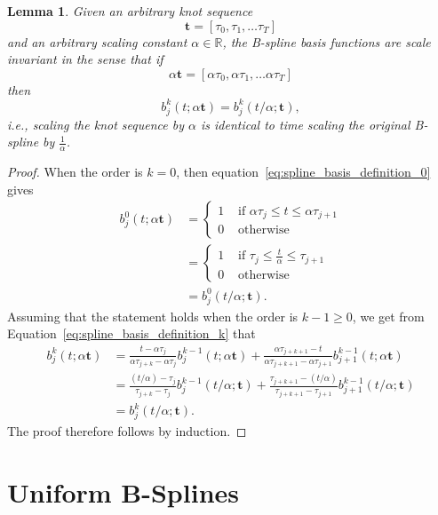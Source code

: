 \documentclass{article}
\newtheorem{lemma}[theorem]{Lemma}
\begin{document}
\begin{lemma}\label{lem:bases_are_scale_invariant}
Given an arbitrary knot sequence
\[
\mathbf{t} = [\tau_0, \tau_1, \dots \tau_T]
\]
and an arbitrary scaling constant $\alpha\in\mathbb{R}$, the B-spline basis functions are scale invariant in the sense that
if 
\[
\alpha\mathbf{t} = [\alpha\tau_0, \alpha\tau_1, \dots \alpha\tau_T]
\]
then
\[
b_j^k(t; \alpha\mathbf{t}) = b_j^k(t/\alpha; \mathbf{t}),
\]
i.e., scaling the knot sequence by $\alpha$ is identical to time scaling the original B-spline by $\frac{1}{\alpha}$.
\end{lemma}
\begin{proof}
When the order is $k=0$, then equation~\eqref{eq:spline_basis_definition_0} gives
\begin{align*}
	b_j^0(t; \alpha\mathbf{t}) &= \begin{cases} 1 & \text{~if~} \alpha\tau_j \leq t \leq \alpha\tau_{j+1} \\ 
 									 				   0 & \text{~otherwise} 
 					   					 \end{cases} \\
 					   				   &= \begin{cases} 1 & \text{~if~} \tau_j \leq \frac{t}{\alpha} \leq \tau_{j+1} \\ 
 									 				   0 & \text{~otherwise} 
 					   					 \end{cases} \\ 	
 					   				   &= b_j^0(t/\alpha; \mathbf{t}).
\end{align*}
Assuming that the statement holds when the order is $k-1\geq 0$, we get from 
Equation~\eqref{eq:spline_basis_definition_k} that
\begin{align*}
b_j^k(t; \alpha\mathbf{t}) &= \frac{t-\alpha\tau_j}{\alpha\tau_{j+k}-
\alpha\tau_j} b_j^{k-1}(t; \alpha\mathbf{t}) + \frac{\alpha\tau_{j+k+1}-t}{\alpha\tau_{j+k+1}-\alpha\tau_{j+1}} b_{j+1}^{k-1}(t; \alpha\mathbf{t}) \\
&= \frac{(t/\alpha)-\tau_j}{\tau_{j+k}-
\tau_j} b_j^{k-1}(t/\alpha; \mathbf{t}) + \frac{\tau_{j+k+1}-(t/\alpha)}{\tau_{j+k+1}-\tau_{j+1}} b_{j+1}^{k-1}(t/\alpha; \mathbf{t}) \\
&= b_j^k(t/\alpha; \mathbf{t}).
\end{align*}
The proof therefore follows by induction.
\end{proof}


\section{Uniform B-Splines}
\end{document}
